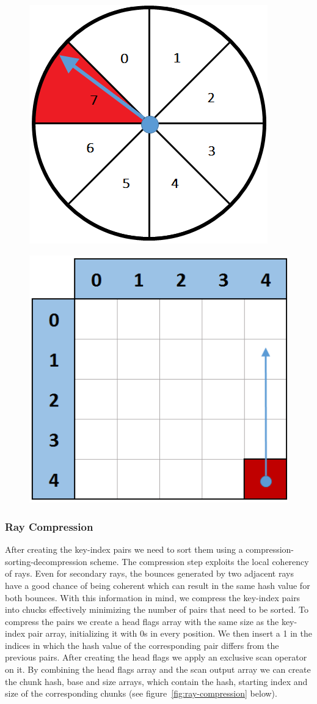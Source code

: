 \documentclass{llncs}
\begin{document}
\begin{figure}
\centering
\begin{minipage}{.5\textwidth}
  \centering
  \includegraphics[width=.45\linewidth]{images/figure 7.png}
  \label{fig:directional-partitioning}
\end{minipage}%
\begin{minipage}{.5\textwidth}
  \centering
  \includegraphics[width=.45\linewidth]{images/figure 8.png}
  \label{fig:spatial-partitioning}
\end{minipage}
\end{figure}

%
\subsubsection{Ray Compression}
%

After creating the key-index pairs we need to sort them using a compression-sorting-decompression scheme. The compression step exploits the local coherency of rays. Even for secondary rays, the bounces generated by two adjacent rays have a good chance of being coherent which can result  in the same hash value for both bounces. With this information in mind, we compress the key-index pairs into chucks effectively minimizing the number of pairs that need to be sorted. To compress the pairs we create a head flags array with the same size as the key-index pair array, initializing it with 0s in every position. We then insert a 1 in the indices in which the hash value of the corresponding pair differs from the previous pairs. After creating the head flags we apply an exclusive scan operator on it. By combining the head flags array and the scan output array we can create the chunk hash, base and size arrays, which contain the hash, starting index and size of the corresponding chunks (see figure~\ref{fig:ray-compression} below).
\end{document}
